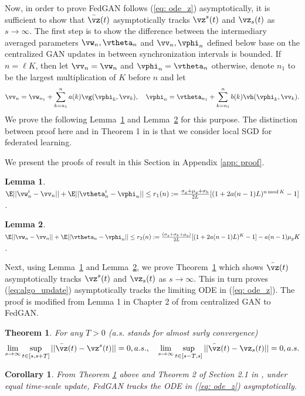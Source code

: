 \documentclass{article}
\newtheorem{theorem}{Theorem}
\newtheorem{lemma}{Lemma}
\newtheorem{corollary}{Corollary}
\def\lemref#1{Lemma~\ref{#1}}
\def\thmref#1{Theorem~\ref{#1}}
\begin{document}
	Now, in order to prove FedGAN follows (\ref{eq: ode_z}) asymptotically, it is sufficient to show that $\bar{\vz}(t)$ asymptotically tracks $\vz^s(t)$ and $\vz_s(t)$ as $s\to \infty$. The first step is to show the difference between the intermediary averaged parameters ${\vw}_{n},{\vtheta}_{n}$ and $\vv_n,\vphi_n$ defined below base on the centralized GAN updates in between synchronization intervals is bounded. If $n=\ell K$, then let $\vv_{n}=\vw_{n}$ and $\vphi_{n}=\vtheta_{n}$ otherwise, denote $n_1$ to be the largest multiplication of $K$
 before $n$ and let
    \begin{align}
	  \vv_n = \vw_{n_1} + \sum_{k=n_1}^n a(k) \vg(\vphi_k, \vv_k), \quad
	  \vphi_n = \vtheta_{n_1} + \sum_{k=n_1}^n b(k) \vh(\vphi_k, \vv_k).
	\end{align}
	We prove the following \lemref{lem: bound_var} and \lemref{lem: bound_grad_div} for this purpose. The distinction between proof here and in Theorem 1 in \citep{wang2019adaptive} is that we consider local SGD for federated learning. 
	
	We present the proofs of result in this Section in Appendix \ref{app: proof}.
	
	\begin{lemma}
		\label{lem: bound_var}
		$\E ||\vw^i_n-\vv_n||+\E||\vtheta^i_n-\vphi_n||\leq r_1(n):= \frac{\sigma_g+\mu_g+\sigma_h}{2L}[(1+2a(n-1)L)^{n\, \text{mod}\, K}-1]$.  
	\end{lemma}
	
	\begin{lemma}
		\label{lem: bound_grad_div}
		$\E||{\vw}_{n}-\vv_{n}||+\E||{\vtheta}_{n}-\vphi_{n}||\leq r_2(n):=\frac{(\sigma_g+\sigma_h+\mu_g)}{2L}[(1+2a(n-1)L)^{K}-1]-a(n-1)\mu_gK $.
	\end{lemma}
	
	Next, using  \lemref{lem: bound_var} and \lemref{lem: bound_grad_div}, we prove \thmref{thm: equal_traj} which shows $\bar{\vz}(t)$ asymptotically tracks $\vz^s(t)$ and $\vz_s(t)$ as $s\to \infty$. This in turn proves (\ref{eq:algo_update}) asymptotically tracks the  limiting ODE in (\ref{eq: ode_z}). The proof is modified from Lemma 1 in Chapter 2 of \citep{borkar2009stochastic} from centralized GAN to FedGAN.
	\begin{theorem}
		\label{thm: equal_traj}
		For any $T>0$ (a.s. stands for almost surly convergence)
		\begin{equation} 
		\lim_{s\rightarrow \infty} \sup_{t\in [s,s+T]} ||\bar{\vz}(t)-\vz^s(t)|| = 0, a.s.,\quad
		\lim_{s\rightarrow \infty} \sup_{t\in [s-T,s]} ||\bar{\vz}(t)-\vz_s(t)|| = 0, a.s. 
		\end{equation}
	\end{theorem}
	\begin{corollary}
	From Theorem \ref{thm: equal_traj} above and Theorem 2 of Section 2.1 in \cite{borkar2009stochastic}, under equal time-scale update, FedGAN tracks the ODE in (\ref{eq: ode_z}) asymptotically.
	\end{corollary}
	
\end{document}
